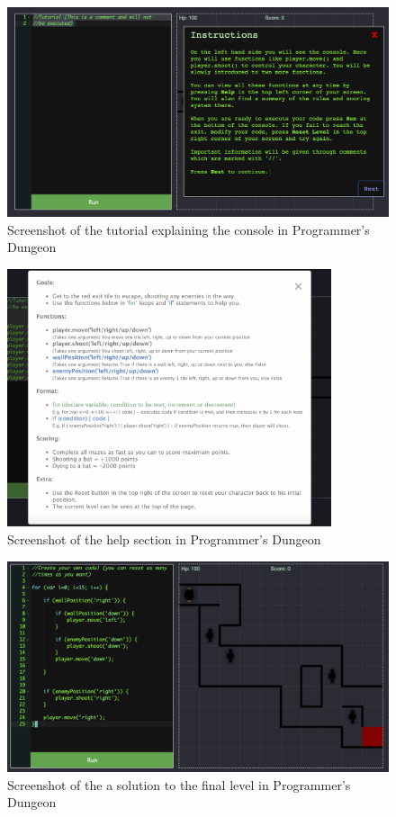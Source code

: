 \documentclass[a4paper,11.5pt]{report}
\numberwithin{figure}{section}
\numberwithin{table}{section}
\numberwithin{equation}{section}
\numberwithin{equation}{section}
\begin{document}
\begin{figure}[H]
 \centering
    \includegraphics[width=1\textwidth]{tutorialconsole}
       \captionsetup{justification=centering}
\caption{Screenshot of the tutorial explaining the console in Programmer's Dungeon}
\label{fig:tutorialconsole}
\end{figure}

\begin{figure}[H]
 \centering
    \includegraphics[width=0.85\textwidth]{helpsection}
       \captionsetup{justification=centering}
\caption{Screenshot of the help section in Programmer's Dungeon}
\label{fig:helpsection}
\end{figure}


\begin{figure}[H]
 \centering
    \includegraphics[width=1\textwidth]{finallevel}
       \captionsetup{justification=centering}
\caption{Screenshot of the a solution to the final level in Programmer's Dungeon}
\label{fig:finallevel}
\end{figure}
\end{document}
